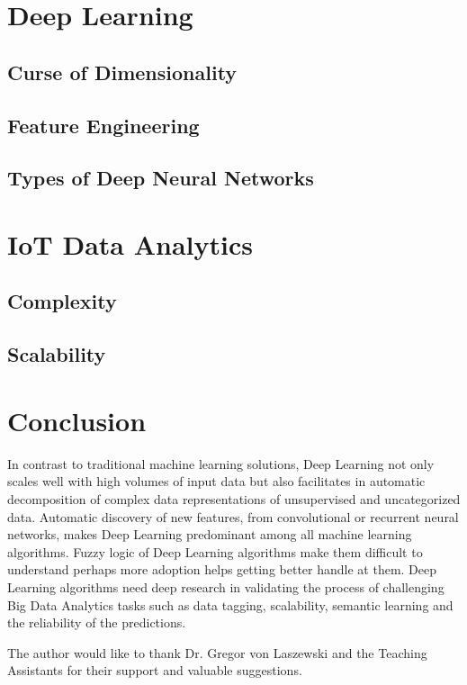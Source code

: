 \documentclass[sigconf]{acmart}
\begin{document}
	\section{Deep Learning}
	\subsection{Curse of Dimensionality}
	\subsection{Feature Engineering}
	\subsection{Types of Deep Neural Networks}
	
	\section{IoT Data Analytics}
	\subsection{Complexity}
	\subsection{Scalability}
	
	\section{Conclusion}		

	In contrast to traditional machine learning solutions, Deep Learning not only scales well with high volumes of input data but also facilitates in automatic decomposition of complex data representations of unsupervised and uncategorized data. Automatic discovery of new features, from convolutional or recurrent neural networks, makes Deep Learning predominant among all machine learning algorithms. Fuzzy logic of Deep Learning algorithms make them difficult to understand perhaps more adoption helps getting better handle at them. Deep Learning algorithms need deep research in validating the process of challenging Big Data Analytics tasks such as data tagging, scalability, semantic learning and the reliability of the predictions. 
 
	
	\begin{acks}		
	
		The author would like to thank Dr. Gregor von Laszewski and the Teaching Assistants for their support and valuable suggestions.
		
	\end{acks}

	
	 
	

	
\end{document}
